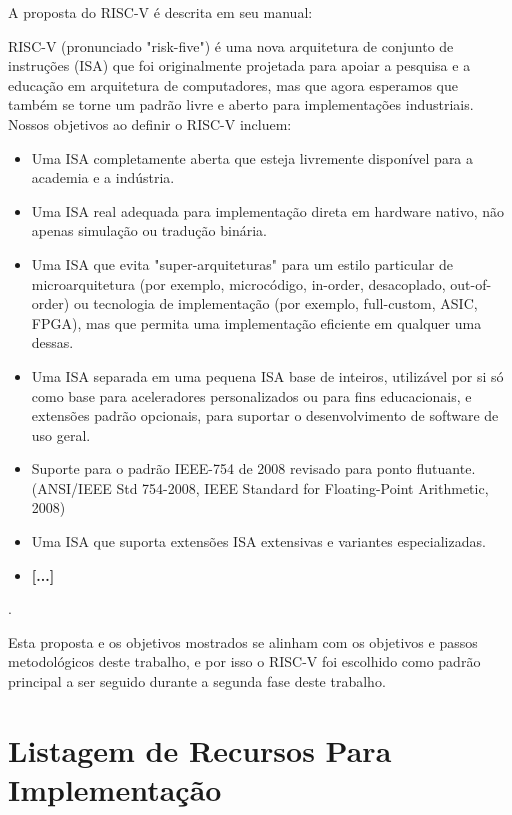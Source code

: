\documentclass[
	12pt,				%
	openright,			%
	oneside,			%
	a4paper,			%
	english,			%
	french,				%
	spanish,			%
	brazil,				%
	]{abntex2}
\begin{document}
A proposta do RISC-V é descrita em seu manual:
\vspace{1.5cm} %
\begin{adjustwidth}{4cm}{0cm} %
\fontsize{10pt}{12pt}\selectfont

RISC-V (pronunciado "risk-five") é uma nova arquitetura de conjunto de instruções (ISA) que foi originalmente projetada para apoiar a pesquisa e a educação em arquitetura de computadores, mas que agora esperamos que também se torne um padrão livre e aberto para implementações industriais. Nossos objetivos ao definir o RISC-V incluem:

\begin{itemize}
    \item Uma ISA completamente aberta que esteja livremente disponível para a academia e a indústria.
    \item Uma ISA real adequada para implementação direta em hardware nativo, não apenas simulação ou tradução binária.
    \item Uma ISA que evita "super-arquiteturas" para um estilo particular de microarquitetura (por exemplo, microcódigo, in-order, desacoplado, out-of-order) ou tecnologia de implementação (por exemplo, full-custom, ASIC, FPGA), mas que permita uma implementação eficiente em qualquer uma dessas.
    \item Uma ISA separada em uma pequena ISA base de inteiros, utilizável por si só como base para aceleradores personalizados ou para fins educacionais, e extensões padrão opcionais, para suportar o desenvolvimento de software de uso geral.
    \item Suporte para o padrão IEEE-754 de 2008 revisado para ponto flutuante. (ANSI/IEEE Std 754-2008, IEEE Standard for Floating-Point Arithmetic, 2008)
    \item Uma ISA que suporta extensões ISA extensivas e variantes especializadas.
    \item \textbf{[...]}
\end{itemize}
\cite{risc-v_risc-v_2024}.
\end{adjustwidth}

Esta proposta e os objetivos mostrados se alinham com os objetivos e passos metodológicos deste trabalho, e por isso o RISC-V foi escolhido como padrão principal a ser seguido durante a segunda fase deste trabalho.

\section{Listagem de Recursos Para Implementação}\label{recursosMelhorias}
\end{document}
